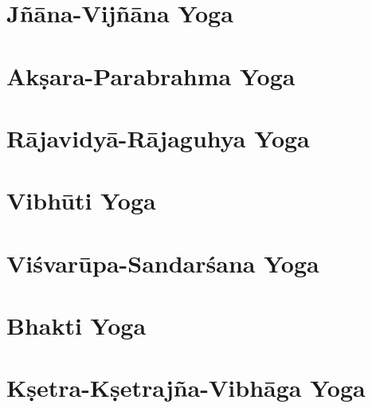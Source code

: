 \documentclass{scrbook}
\begin{document}
\chapter{Jñāna-Vijñāna Yoga}


\chapter{Akṣara-Parabrahma Yoga}


\chapter{Rājavidyā-Rājaguhya Yoga}


\chapter{Vibhūti Yoga}


\chapter{Viśvarūpa-Sandarśana Yoga}


\chapter{Bhakti Yoga}


\chapter{Kṣetra-Kṣetrajña-Vibhāga Yoga}

\end{document}
